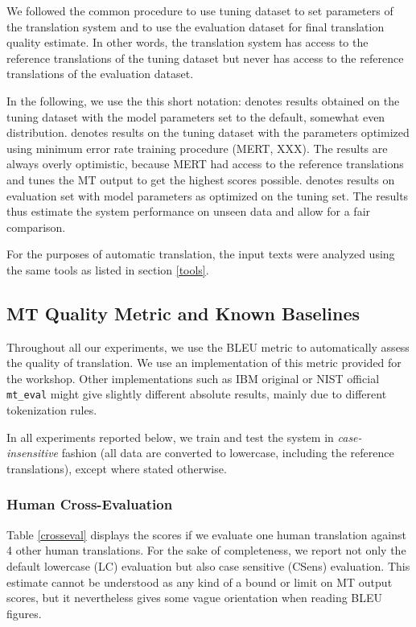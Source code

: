 \documentclass[10pt]{report}
\theoremstyle{plain}
\begin{document}
{{We followed the common procedure to use tuning dataset to set parameters of the
translation system and to use the evaluation dataset for final translation
quality estimate. In other words, the translation system has access to the
reference translations of the tuning dataset but never has access to the
reference translations of the evaluation dataset.

In the following, we use the this short notation:  denotes
results obtained on the tuning dataset with the model parameters set to the
default, somewhat even distribution.  denotes results on the
tuning dataset with the parameters optimized using minimum error rate training
procedure (MERT, XXX). The  results are always overly
optimistic, because MERT had access to the reference translations and tunes the
MT output to get the highest scores possible.  denotes results on evaluation set with model parameters as optimized on
the tuning set. The  results thus estimate the system
performance on unseen data and allow for a fair comparison.

For the purposes of automatic translation, the input texts were analyzed using
the same tools as listed in section \ref{tools}.



\subsection{MT Quality Metric and Known Baselines}
\label{baselines}

Throughout all our experiments, we use the BLEU metric 
to automatically assess the quality of translation. We use an implementation of
this metric provided for the workshop. Other implementations such as IBM
original or NIST official {\tt mt\_eval} might give slightly
different absolute results, mainly due to different tokenization rules.

In all experiments reported below, we train and test the system in
\emph{case-insensitive} fashion (all data are converted to lowercase, including
the reference translations), except where stated otherwise.



\subsubsection{Human Cross-Evaluation}

Table \ref{crosseval} displays the scores if we evaluate one human translation
against 4 other human translations. For the sake of completeness, we report not
only the default lowercase (LC) evaluation but also case sensitive (CSens)
evaluation. This estimate cannot be understood as any kind of a bound or limit
on MT output scores, but it nevertheless gives some vague orientation when
reading BLEU figures.

}}
\end{document}
